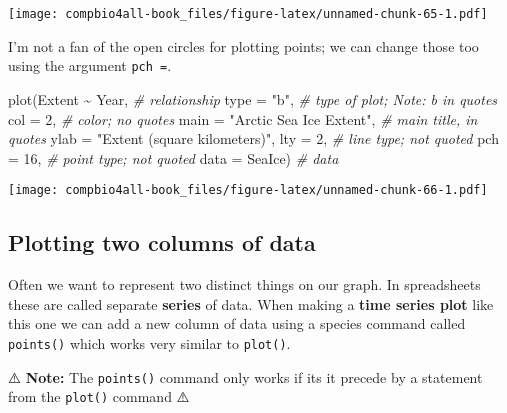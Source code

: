 \documentclass[
]{book}
\newenvironment{Shaded}{\begin{snugshade}}{\end{snugshade}}
\newcommand{\AttributeTok}[1]{\textcolor[rgb]{0.77,0.63,0.00}{#1}}
\newcommand{\CommentTok}[1]{\textcolor[rgb]{0.56,0.35,0.01}{\textit{#1}}}
\newcommand{\DecValTok}[1]{\textcolor[rgb]{0.00,0.00,0.81}{#1}}
\newcommand{\FunctionTok}[1]{\textcolor[rgb]{0.00,0.00,0.00}{#1}}
\newcommand{\NormalTok}[1]{#1}
\newcommand{\SpecialCharTok}[1]{\textcolor[rgb]{0.00,0.00,0.00}{#1}}
\newcommand{\StringTok}[1]{\textcolor[rgb]{0.31,0.60,0.02}{#1}}
\begin{document}
\texttt{[image: compbio4all-book\_files/figure-latex/unnamed-chunk-65-1.pdf]}

I'm not a fan of the open circles for plotting points; we can change those too using the argument \texttt{pch\ =}.

\begin{Shaded}
\begin{Highlighting}[]
\FunctionTok{plot}\NormalTok{(Extent }\SpecialCharTok{\textasciitilde{}}\NormalTok{ Year,  }\CommentTok{\# relationship}
     \AttributeTok{type =} \StringTok{"b"}\NormalTok{,     }\CommentTok{\# type of plot; Note: b in quotes}
     \AttributeTok{col =} \DecValTok{2}\NormalTok{,        }\CommentTok{\# color; no quotes}
     \AttributeTok{main =} \StringTok{"Arctic Sea Ice Extent"}\NormalTok{, }\CommentTok{\# main title, in quotes}
     \AttributeTok{ylab =} \StringTok{"Extent (square kilometers)"}\NormalTok{,}
     \AttributeTok{lty =} \DecValTok{2}\NormalTok{,        }\CommentTok{\# line type; not quoted}
     \AttributeTok{pch =} \DecValTok{16}\NormalTok{,       }\CommentTok{\# point type; not quoted}
     \AttributeTok{data =}\NormalTok{ SeaIce)  }\CommentTok{\# data}
\end{Highlighting}
\end{Shaded}

\texttt{[image: compbio4all-book\_files/figure-latex/unnamed-chunk-66-1.pdf]}

\hypertarget{plotting-two-columns-of-data}{%
\subsection{Plotting two columns of data}\label{plotting-two-columns-of-data}}

Often we want to represent two distinct things on our graph. In spreadsheets these are called separate \textbf{series} of data. When making a \textbf{time series plot} like this one we can add a new column of data using a species command called \texttt{points()} which works very similar to \texttt{plot()}.

⚠️ \textbf{Note:} The \texttt{points()} command only works if its it precede by a statement from the \texttt{plot()} command ⚠️
\end{document}
